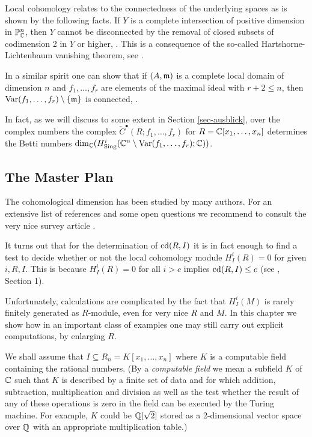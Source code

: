 Local cohomology relates to the connectedness of the underlying spaces
as is shown by the following facts. If $Y$ is a complete intersection
of positive dimension in ${\mathbb P}^n_{\mathbb C}$, then $Y$ cannot be disconnected by
the removal of closed subsets of codimension 2 in $Y$ or higher,
\cite{DM:Br-R}. 
This is a
consequence of the so-called Hartshorne-Lichtenbaum vanishing theorem,
see \cite{DM:B-S}.

In a similar spirit one can show that if $(A,{\mathfrak m})$ is a complete
local domain of dimension $n$ and $f_1,\ldots,f_r$ are elements of the
maximal ideal with $r+2\le n$, then
$\operatorname{Var}(f_1,\ldots,f_r)\setminus\{{\mathfrak m}\}$ 
is connected, \cite{DM:Br-R}.

In fact, as we will discuss to some extent in Section \ref{sec-ausblick}, 
over the complex numbers the complex $\check
C^\bullet(R;f_1,\ldots,f_r)$ for $R={\mathbb C}[x_1,\ldots,x_n]$ determines
the Betti numbers
$\dim_{\mathbb C}(H^i_{{\rm Sing}}({\mathbb C}^n\setminus\operatorname{Var}(f_1,\ldots,f_r);{\mathbb C}))$.
\subsection{The Master Plan} 
The cohomological dimension has been studied by many authors. For an
extensive list of references and some open questions 
we recommend to consult 
the very nice survey article \cite{DM:Hu}. 

It turns out that for the determination of $\operatorname{cd}(R,I)$ it is in
fact enough to find a test to 
decide whether or not the local cohomology module $H^i_I(R)=0$ for
given $i, R, I$. This is because $H^i_I(R)=0$ for all $i>c$ implies
$\operatorname{cd}(R,I)\le c$ (see \cite{DM:CDAV}, Section 1).  

Unfortunately,
calculations are complicated by the fact that $H^i_I(M)$ is rarely
finitely generated as $R$-module, even for very nice $R$ and $M$. 
In this
chapter we show how in an important class of examples one may still
carry out explicit computations, by enlarging $R$. 

We shall assume that 
$I\subseteq R_n=K[x_1,\ldots,x_n]$ where $K$ is a
computable field
containing the rational numbers. (By a
{\em computable field} 
we mean a subfield $K$ of ${\mathbb C}$ such that $K$ is
described by a finite set of data and for which addition, subtraction,
multiplication and division as well as the test whether the result of
any of these operations is zero in the field can be executed by the
Turing machine. For example, $K$ could be ${\mathbb Q}[\sqrt 2]$ stored as a
2-dimensional vector space over ${\mathbb Q}$ with an appropriate
multiplication table.)

